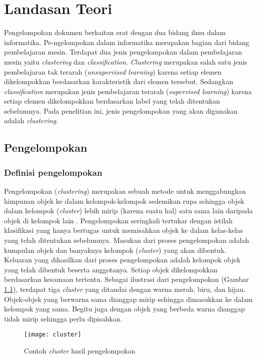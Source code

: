 \chapter{Landasan Teori}
\label{chap:teori}

Pengelompokan dokumen berkaitan erat dengan dua bidang ilmu dalam informatika. Pe-ngelompokan dalam informatika merupakan bagian dari bidang pembelajaran mesin. Terdapat dua jenis pengelompokan dalam pembelajaran mesin yaitu \textit{clustering} dan \textit{classification}. \textit{Clustering} merupakan salah satu jenis pembelajaran tak terarah (\textit{unsupervised learning}) karena setiap elemen dikelompokkan berdasarkan karakteristik dari elemen tersebut. Sedangkan \textit{classification} merupakan jenis pembelajaran terarah (\textit{supervised learning}) karena setiap elemen dikelompokkan berdasarkan label yang telah ditentukan sebelumnya. Pada penelitian ini, jenis pengelompokan yang akan digunakan adalah \textit{clustering}.

\section{Pengelompokan}
\subsection{Definisi pengelompokan}
Pengelompokan (\textit{clustering}) merupakan sebuah metode untuk menggabungkan himpunan objek ke dalam kelompok-kelompok sedemikan rupa sehingga objek dalam kelompok (\textit{cluster}) lebih mirip (karena suatu hal) satu sama lain daripada objek di kelompok lain \cite{gan2007data}. Pengelompokan seringkali tertukar dengan istilah klasifikasi yang hanya bertugas untuk memisahkan objek ke dalam kelas-kelas yang telah ditentukan sebelumnya. Masukan dari proses pengelompokan adalah kumpulan objek dan banyaknya kelompok (\textit{cluster}) yang akan dibentuk. Keluaran yang dihasilkan dari proses pengelompokan adalah kelompok objek yang telah dibentuk beserta anggotanya. Setiap objek dikelompokkan berdasarkan kesamaan tertentu. Sebagai ilustrasi dari pengelompokan (Gambar \ref{fig:cluster}), terdapat tiga \textit{cluster} yang ditandai dengan warna merah, biru, dan hijau. Objek-objek yang berwarna sama dianggap mirip sehingga dimasukkan ke dalam kelompok yang sama. Begitu juga dengan objek yang berbeda warna dianggap tidak mirip sehingga perlu dipisahkan.

\begin{figure}[h]
	\begin{center}
		\texttt{[image: cluster]}
		\caption{Contoh \textit{cluster} hasil pengelompokan}
		\label{fig:cluster}
	\end{center}
\end{figure}

